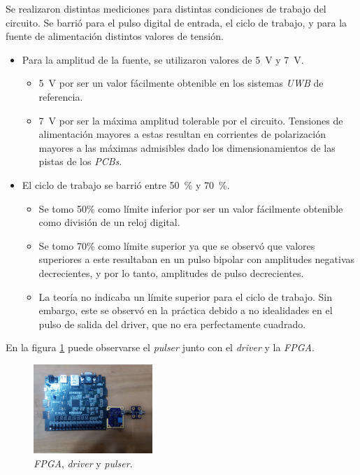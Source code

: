 Se realizaron distintas mediciones para distintas condiciones de trabajo del
circuito. Se barrió para el pulso digital de entrada, el ciclo de trabajo, y
para la fuente de alimentación distintos valores de tensión.

\begin{itemize}
    \item Para la amplitud de la fuente, se utilizaron valores de \qty{5}{\volt} y
        \qty{7}{\volt}.
        \begin{itemize}
            \item \qty{5}{\volt} por ser un valor fácilmente obtenible en los
                sistemas \textit{UWB} de referencia.
            \item \qty{7}{\volt} por ser la máxima amplitud tolerable por el circuito.
                Tensiones de alimentación mayores a estas resultan en corrientes de
                polarización mayores a las máximas admisibles dado los
                dimensionamientos de las pistas de los \textit{PCBs}.
        \end{itemize}
    \item El ciclo de trabajo se barrió entre \qty{50}{\percent} y
        \qty{70}{\percent}.
        \begin{itemize}
            \item Se tomo 50\% como límite inferior por ser un valor fácilmente
                obtenible como división de un reloj digital.
            \item Se tomo 70\% como límite superior ya que se observó que valores
                superiores a este resultaban en un pulso bipolar con amplitudes
                negativas decrecientes, y por lo tanto, amplitudes de pulso
                decrecientes.
            \item La teoría no indicaba un límite superior para el ciclo de
                trabajo. Sin embargo, este se observó en la práctica debido a no
                idealidades en el pulso de salida del driver, que no era
                perfectamente cuadrado.
        \end{itemize}
\end{itemize}

En la figura \ref{fig:sistema_medido} puede observarse el \textit{pulser} junto con el
\textit{driver} y la \textit{FPGA}.

\begin{figure}
  \centering
    \includegraphics[width=0.4\textwidth]{images/sistema_medido.jpg}
    \caption{\textit{FPGA}, \textit{driver} y \textit{pulser}.}
    \label{fig:sistema_medido}
\end{figure}

